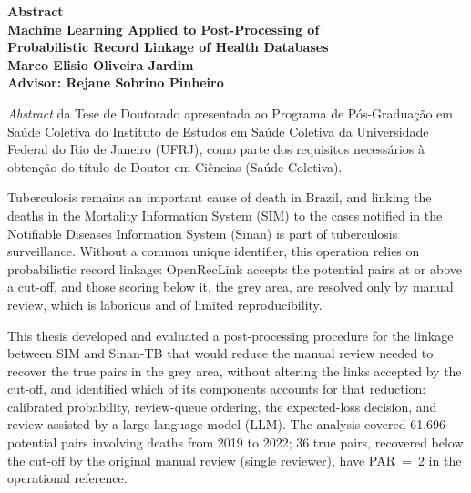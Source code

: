 \documentclass[12pt,a4paper,openany]{book}
\begin{document}
\vspace*{20pt}
\begin{center}
{\LARGE\bf Abstract}\\
\vspace{15pt}
{\Large\bf Machine Learning Applied to Post-Processing of\\Probabilistic Record Linkage of Health Databases}\\
\vspace{6pt}
{\bf Marco Elisio Oliveira Jardim}\\
\vspace{12pt}
{\bf Advisor: Rejane Sobrino Pinheiro}\\
\vspace{20pt}
\parbox{14cm}{\emph{Abstract} da Tese de Doutorado apresentada ao Programa de Pós-Graduação em Saúde Coletiva do Instituto de Estudos em Saúde Coletiva da Universidade Federal do Rio de Janeiro (UFRJ), como parte dos requisitos necessários à obtenção do título de Doutor em Ciências (Saúde Coletiva).} %
\end{center}
\vspace*{35pt}

Tuberculosis remains an important cause of death in Brazil, and linking the deaths in the Mortality Information System (SIM) to the cases notified in the Notifiable Diseases Information System (Sinan) is part of tuberculosis surveillance. Without a common unique identifier, this operation relies on probabilistic record linkage: OpenRecLink accepts the potential pairs at or above a cut-off, and those scoring below it, the grey area, are resolved only by manual review, which is laborious and of limited reproducibility.

This thesis developed and evaluated a post-processing procedure for the linkage between SIM and Sinan-TB that would reduce the manual review needed to recover the true pairs in the grey area, without altering the links accepted by the cut-off, and identified which of its components accounts for that reduction: calibrated probability, review-queue ordering, the expected-loss decision, and review assisted by a large language model (LLM). The analysis covered 61,696 potential pairs involving deaths from 2019 to 2022; 36 true pairs, recovered below the cut-off by the original manual review (single reviewer), have PAR~=~2 in the operational reference.
\end{document}
